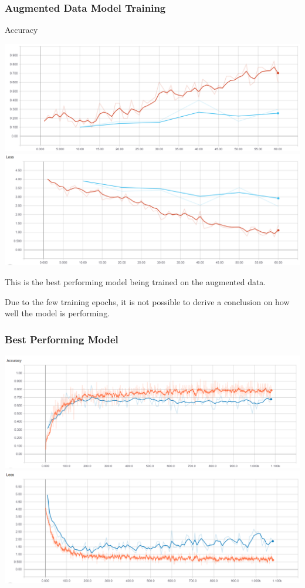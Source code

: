 \documentclass[11pt]{article}
\makeatletter
\def\maxwidth{\ifdim\Gin@nat@width>\linewidth\linewidth
    \else\Gin@nat@width\fi}
\let\Oldincludegraphics\includegraphics
\renewcommand{\includegraphics}[1]{\Oldincludegraphics[width=.8\maxwidth]{#1}}
\makeatother
\begin{document}
    \hypertarget{augmented-data-model-training}{%
\subsubsection{Augmented Data Model
Training}\label{augmented-data-model-training}}

    Accuracy

    \includegraphics{imgs/augmented_model_training_acc.png}
\includegraphics{imgs/augmented_model_training_loss.png}

    This is the best performing model being trained on the augmented data.

Due to the few training epochs, it is not possible to derive a
conclusion on how well the model is performing.

    \hypertarget{best-performing-model}{%
\subsubsection{Best Performing Model}\label{best-performing-model}}

    \includegraphics{imgs/best_full_model_training_acc.png}
\includegraphics{imgs/best_full_model_training_loss.png}
\end{document}

